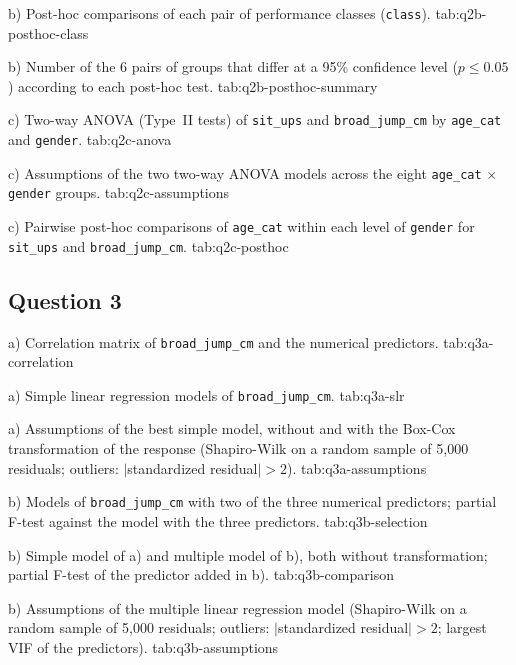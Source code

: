   {b) Post-hoc comparisons of each pair of performance classes (\texttt{class}).}
  {tab:q2b-posthoc-class}

  {b) Number of the 6 pairs of groups that differ at a 95\% confidence level ($p \leq 0.05$) according to each post-hoc test.}
  {tab:q2b-posthoc-summary}

  {c) Two-way ANOVA (Type~II tests) of \texttt{sit\_ups} and \texttt{broad\_jump\_cm} by \texttt{age\_cat} and \texttt{gender}.}
  {tab:q2c-anova}

  {c) Assumptions of the two two-way ANOVA models across the eight \texttt{age\_cat} $\times$ \texttt{gender} groups.}
  {tab:q2c-assumptions}

  {c) Pairwise post-hoc comparisons of \texttt{age\_cat} within each level of \texttt{gender} for \texttt{sit\_ups} and \texttt{broad\_jump\_cm}.}
  {tab:q2c-posthoc}

\clearpage
\subsection{Question 3}

  {a) Correlation matrix of \texttt{broad\_jump\_cm} and the numerical predictors.}
  {tab:q3a-correlation}

  {a) Simple linear regression models of \texttt{broad\_jump\_cm}.}
  {tab:q3a-slr}

  {a) Assumptions of the best simple model, without and with the Box-Cox transformation of the response (Shapiro-Wilk on a random sample of 5,000 residuals; outliers: $|$standardized residual$| > 2$).}
  {tab:q3a-assumptions}

  {b) Models of \texttt{broad\_jump\_cm} with two of the three numerical predictors; partial F-test against the model with the three predictors.}
  {tab:q3b-selection}

  {b) Simple model of a) and multiple model of b), both without transformation; partial F-test of the predictor added in b).}
  {tab:q3b-comparison}

  {b) Assumptions of the multiple linear regression model (Shapiro-Wilk on a random sample of 5,000 residuals; outliers: $|$standardized residual$| > 2$; largest VIF of the predictors).}
  {tab:q3b-assumptions}

